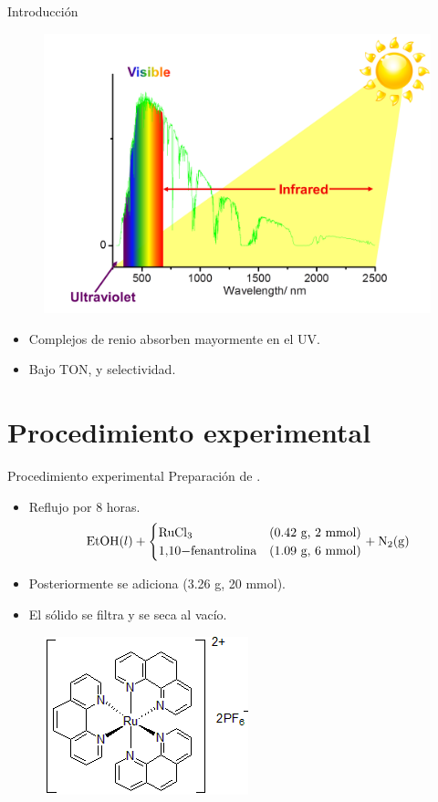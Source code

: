 \documentclass[handout]{beamer}
\begin{document}
\begin{frame}{Introducci\'on}
	\begin{figure}[h]
		\centering
		\includegraphics[width=0.8\linewidth]{sources/spectrum}
	\end{figure}
	\begin{itemize}
		\item Complejos de renio absorben mayormente en el UV.
		\item Bajo TON, y selectividad.
	\end{itemize}
\end{frame}

\section{Procedimiento experimental}
\begin{frame}{Procedimiento experimental}
	Preparaci\'on de .
	\begin{itemize}
		\item Reflujo por 8 horas.
		\begin{equation*}
			\ce{EtOH}(l) + 
			\begin{cases}
				\ce{RuCl3} &  \text{(0.42 g, 2 mmol)} \\
				\ce{1,10-fenantrolina} & \text{(1.09 g, 6 mmol)}
			\end{cases}
			+ \ce{N2(g)}
		\end{equation*}
		\item Posteriormente se adiciona  (3.26 g, 20 mmol).
		\item El s\'olido se filtra y se seca al vac\'io.
	\end{itemize}
	\begin{figure}[h]
		\centering
		\includegraphics[width=0.3\linewidth]{sources/ru}
	\end{figure}
\end{frame}
\end{document}
